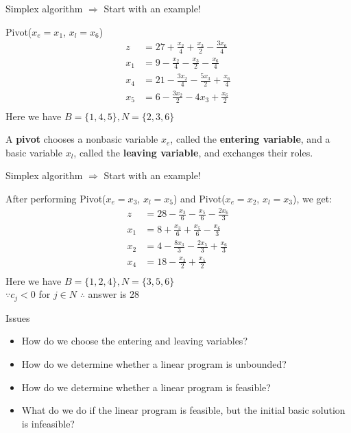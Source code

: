 \begin{frame}{Simplex algorithm $\Rightarrow$ Start with an example!}

    \begin{block}{Pivot($x_e = x_1$, $x_l = x_6$)}
        \begin{align*}
            z   & = 27 + \frac{x_2}{4} + \frac{x_3}{2} - \frac{3x_6}{4}  \\
            x_1 & = 9 - \frac{x_2}{4} - \frac{x_3}{2} - \frac{x_6}{4}    \\
            x_4 & = 21 - \frac{3x_2}{4} - \frac{5x_3}{2} + \frac{x_6}{4} \\
            x_5 & = 6 - \frac{3x_2}{2} - 4x_3 + \frac{x_6}{2}            \\
        \end{align*}
        Here we have $B = \{1, 4, 5\}, N = \{2, 3, 6\}$
    \end{block}

    A \textbf{pivot} chooses a nonbasic variable $x_e$,
    called the \textbf{entering variable}, and a basic variable $x_l$,
    called the \textbf{leaving variable}, and exchanges their roles.

\end{frame}

\begin{frame}{Simplex algorithm $\Rightarrow$ Start with an example!}

    After performing Pivot($x_e = x_3$, $x_l = x_5$)
    and Pivot($x_e = x_2$, $x_l = x_3$), we get:
    \begin{align*}
        z   & = 28 - \frac{x_3}{6} - \frac{x_5}{6} - \frac{2x_6}{3} \\
        x_1 & = 8 + \frac{x_3}{6} + \frac{x_5}{6} - \frac{x_6}{3}   \\
        x_2 & = 4 - \frac{8x_3}{3} - \frac{2x_5}{3} + \frac{x_6}{3} \\
        x_4 & = 18 - \frac{x_3}{2} + \frac{x_5}{2}                  \\
    \end{align*}
    Here we have $B = \{1, 2, 4\}, N = \{3, 5, 6\}$\\
    $\because c_j < 0$ for $j\in N$
    $\therefore$ answer is $28$

\end{frame}

\begin{frame}{Issues}

    \begin{itemize}
        \item How do we choose the entering and leaving variables?
        \item How do we determine whether a linear program is unbounded?
        \item How do we determine whether a linear program is feasible?
        \item What do we do if the linear program is feasible,
              but the initial basic solution is infeasible?
    \end{itemize}

\end{frame}


